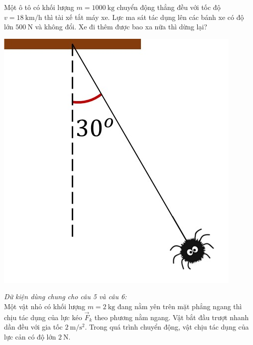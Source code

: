 \begin{ex}
	Một ô tô có khối lượng $m=\SI{1000}{\kilogram}$ chuyển động thẳng đều với tốc độ $v=\SI{18}{\kilo\meter/\hour}$ thì tài xế tắt máy xe. Lực ma sát tác dụng lên các bánh xe có độ lớn $\SI{500}{\newton}$ và không đổi. Xe đi thêm được bao xa nữa thì dừng lại?
	\loigiai{
		
	}
\end{ex}
\begin{ex}
	{\includegraphics[scale=0.3]{../figs/D10-HKI-KTTX2-001-2}}
	\loigiai{
		
	}
\end{ex}
\textit{Dữ kiện dùng chung cho câu 5 và câu 6:}\\
Một vật nhỏ có khối lượng $m=\SI{2}{\kilogram}$ đang nằm yên trên mặt phẳng ngang thì chịu tác dụng của lực kéo $\vec{F}_k$ theo phương nằm ngang. Vật bắt đầu trượt nhanh dần đều với gia tốc $\SI{2}{\meter/\second^2}$. Trong quá trình chuyển động, vật chịu tác dụng của lực cản có độ lớn $\SI{2}{\newton}$.
